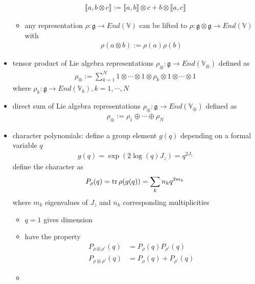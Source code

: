 \documentclass[11pt]{article}
\begin{document}
\begin{itemize}
\begin{align*}
        \llbracket a, b \otimes c \rrbracket := \llbracket a,b \rrbracket \otimes c + b \otimes \llbracket a,c \rrbracket
    \end{align*}
    \begin{itemize}
        \item any representation $\rho: \mathfrak{g} \to End(\mathbb{V})$ can be lifted to $\rho: \mathfrak{g} \otimes \mathfrak{g} \to End(\mathbb{V})$ with 
        \begin{align*}
            \rho (a \otimes b) := \rho(a) \rho(b)
        \end{align*}
    \end{itemize}
    \item tensor product of Lie algebra representations $\rho_\otimes: \mathfrak{g} \to End(\mathbb{V_\otimes})$ defined as 
    \begin{align*}
        \rho_\otimes := \sum_{k=1}^N 1 \otimes \cdots \otimes 1 \otimes \rho_k \otimes 1 \otimes \cdots \otimes 1 
    \end{align*}
    where $\rho_k: \mathfrak{g} \to End(\mathbb{V}_k), k = 1, \cdots, N$ 
    \item direct sum of Lie algebra representations $\rho_\oplus: \mathfrak{g} \to End(\mathbb{V}_\oplus)$ defined as 
    \begin{align*}
        \rho_\oplus := \rho_1 \oplus \cdots \oplus \rho_N 
    \end{align*}
    \item character polynomials: define a group element $g(q)$ depending on a formal variable $q$ 
    \begin{align*}
        g(q) = \exp(2\log(q)J_z) = q^{2J_z}
    \end{align*}
    define the character as 
    \begin{align*}
        P_\rho (q) = \tr \rho(g(q)) = \sum_k n_k q^{2m_k}
    \end{align*}
    where $m_k$ eigenvalues of $J_z$ and $n_k$ corresponding multiplicities 
    \begin{itemize}
        \item $q = 1$ gives dimension
        \item have the property
         \begin{align*}
            P_{\rho \otimes \rho'}(q) &= P_\rho(q) P_{\rho'}(q) \\
            P_{\rho \oplus \rho'}(q) &= P_\rho(q) + P_{\rho'}(q)
        \end{align*}
        \item 
    \end{itemize}

\end{itemize}
\end{document}
